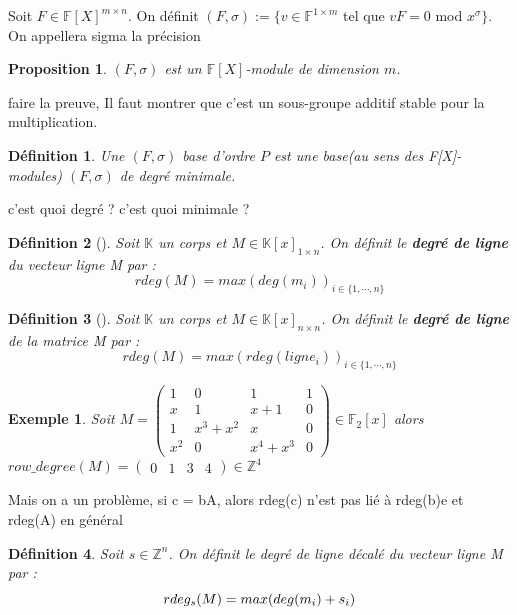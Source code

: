 \documentclass[a4paper,12pt]{report}  %
\theoremstyle{definitionstyle}
\newtheorem{definition}{Définition}[chapter] %
\theoremstyle{examplestyle}
\newtheorem{example}{Exemple}[chapter] %
\theoremstyle{remarkstyle}
\theoremstyle{propositionstyle}
\newtheorem{proposition}{Proposition}[chapter]  %
\theoremstyle{theoremstyle}
\theoremstyle{proofstyle}
\begin{document}
	Soit $F \in \mathbb{F}[X]^{m \times n}$. On définit $(F, \sigma):= \{v \in \mathbb{F}^{1 \times m}$ tel que $ vF = 0$ mod $x^\sigma\}$. On appellera sigma la précision
	
	\begin{proposition}
		$(F, \sigma)$ est un $\mathbb{F}[X]$-module de dimension $m$.
	\end{proposition}

	faire la preuve, Il faut montrer que c'est un sous-groupe additif stable pour la multiplication.
	
	\begin{definition}
		Une $(F, \sigma)$ base d'ordre $P$ est une base(au sens des F[X]-modules) $(F, \sigma)$ de degré minimale.
	\end{definition}
	
	c'est quoi degré ? c'est quoi minimale ?
	
	
	\begin{definition}[\cite{clef_unique_0}]
		Soit $\mathbb{K}$ un corps et $M \in \mathbb{K}[x]_{1 \times n}$. On définit le \textbf{degré de ligne} du vecteur ligne M par : 
		$$rdeg(M)=max(deg(m_i))_{i\in\{1, \cdots, n\}}$$
	\end{definition}
	
	\begin{definition}[\cite{clef_unique_0}]
		Soit $\mathbb{K}$ un corps et $M \in \mathbb{K}[x]_{n \times n}$. On définit le \textbf{degré de ligne} de la matrice M par :
		$$rdeg(M)=max(rdeg(ligne_i))_{i\in\{1, \cdots, n\}}$$
	\end{definition}
	
	\begin{example}
		Soit $M =
		\left(\begin{array}{rrrr}
			1 & 0 & 1 & 1 \\
			x & 1 & x + 1 & 0 \\
			1 & x^{3} + x^{2} & x & 0 \\
			x^{2} & 0 & x^{4} + x^{3} & 0
		\end{array}\right) \in \mathbb{F}_2[x]
		$
		alors $row\_degree(M)=\left(\begin{array}{rrrr}
			0 & 1 & 3 & 4
		\end{array}\right)\in \mathbb{Z}^4$
		
	\end{example}
	
	Mais on a un problème, si c = bA, alors rdeg(c) n'est pas lié à rdeg(b)e et rdeg(A) en général
	
	\begin{definition}
		Soit $s \in \mathbb{Z}^n$. On définit le degré de ligne décalé du vecteur ligne M par :
		$$rdeg_s(M)=max(deg(m_i)+s_i\\)$$
	\end{definition}
\end{document}
